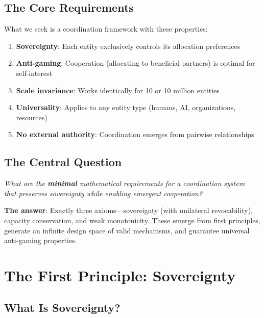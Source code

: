 \documentclass[11pt,a4paper]{article}
\theoremstyle{definition}
\theoremstyle{remark}
\begin{document}
\subsection{The Core Requirements}

What we seek is a coordination framework with these properties:

\begin{enumerate}
\item \textbf{Sovereignty}: Each entity exclusively controls its allocation preferences
\item \textbf{Anti-gaming}: Cooperation (allocating to beneficial partners) is optimal for self-interest
\item \textbf{Scale invariance}: Works identically for 10 or 10 million entities
\item \textbf{Universality}: Applies to any entity type (humans, AI, organizations, resources)
\item \textbf{No external authority}: Coordination emerges from pairwise relationships
\end{enumerate}

\subsection{The Central Question}

\begin{center}
\large
\textit{What are the \textbf{minimal} mathematical requirements for a coordination system}\\
\textit{that preserves sovereignty while enabling emergent cooperation?}
\end{center}

\medskip

\textbf{The answer}: Exactly three axioms—sovereignty (with unilateral revocability), capacity conservation, and weak monotonicity. These emerge from first principles, generate an infinite design space of valid mechanisms, and guarantee universal anti-gaming properties.



\section{The First Principle: Sovereignty}

\subsection{What Is Sovereignty?}
\end{document}
